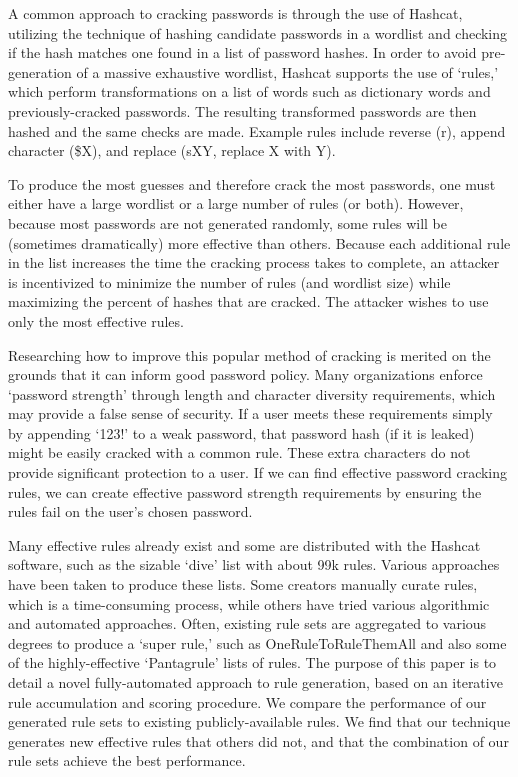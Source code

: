 \documentclass{article}
\begin{document}
A common approach to cracking passwords is through the use of
Hashcat\autocite{hashcat}, utilizing the technique of hashing candidate passwords
in a wordlist and checking if the hash matches one found in a list of password
hashes. In order to avoid pre-generation of a massive exhaustive wordlist,
Hashcat supports the use of `rules,' which perform transformations on a list of
words such as dictionary words and previously-cracked passwords. The resulting
transformed passwords are then hashed and the same checks are made. Example
rules include reverse (r), append character (\$X), and replace (sXY, replace X
with Y).


To produce the most guesses and therefore crack the most passwords, one must
either have a large wordlist or a large number of rules (or both). However,
because most passwords are not generated randomly, some rules will be
(sometimes dramatically) more effective than others. Because each additional
rule in the list increases the time the cracking process takes to complete, an
attacker is incentivized to minimize the number of rules (and wordlist size)
while maximizing the percent of hashes that are cracked. The attacker wishes to
use only the most effective rules.

Researching how to improve this popular method of cracking
is merited on the grounds that it can inform good password policy.
Many organizations enforce `password strength' through
length and character diversity requirements, which may provide a false sense
of security. If a user meets these requirements simply by appending `123!' to a
weak password, that password hash (if it is leaked) might be easily cracked with
a common rule. These extra characters do not provide significant protection to
a user.
If we can find effective password cracking rules, we can create effective
password
strength requirements by ensuring the rules fail on the user's chosen password.


Many effective rules already exist and some are distributed with the Hashcat
software, such as the sizable `dive' list with about 99k rules. Various
approaches have been taken to produce these lists. Some creators manually
curate rules, which is a time-consuming process, while others have tried
various algorithmic and automated approaches. Often, existing rule sets are
aggregated to various degrees to produce a `super rule,' such as
OneRuleToRuleThemAll\autocite{ortrta} and also some of the highly-effective
`Pantagrule' lists of rules\autocite{pantagrule}. The purpose of this paper
is to detail a novel fully-automated approach to rule generation, based on an
iterative rule accumulation and scoring procedure. We compare the performance of
our generated rule sets to existing publicly-available rules. We find that our
technique generates new effective rules that others did not, and that the
combination of our rule sets achieve the best performance.
\end{document}
